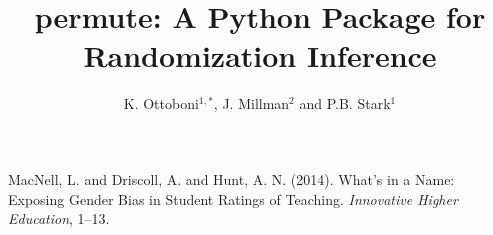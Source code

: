 \documentclass[11pt]{article}
\title{permute: A Python Package for Randomization Inference}
\author{K. Ottoboni$^{1,*}$, J. Millman$^{2}$ and P.B. Stark$^1$}
\begin{document}
\maketitle
\thispagestyle{empty}


\begin{thebibliography}{99}

 MacNell, L. and Driscoll, A. and Hunt, A. N. (2014). What's in a Name: Exposing Gender Bias in Student Ratings of Teaching. \textit{Innovative Higher Education}, %
1--13.


\end{thebibliography}
\end{document}
